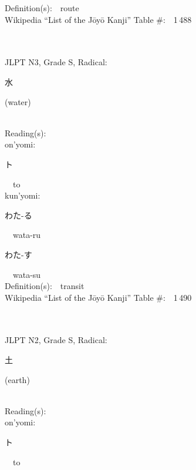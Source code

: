 \begin{multicols}{2}
Definition(s):\ \ route \\
Wikipedia ``List of the J\=oy\=o Kanji'' Table \#:\ \ 1\,488 \\
\ \ \\
{\fontsize{34pt}{40pt}  }\ \ \\  %
{JLPT N3, Grade S, Radical:\ \ {\begin{CJK}{UTF8}{min} 水 \end{CJK}} (water) } \\
Reading(s):\ \ \\
{\hspace*{1em}}on'yomi:\ \ \\
{\hspace*{2em}}{\begin{CJK}{UTF8}{min} ト \end{CJK}}\ \ to\ \ \\
{\hspace*{1em}}kun'yomi:\ \ \\
{\hspace*{2em}}{\begin{CJK}{UTF8}{min} わた-る \end{CJK}}\ \ wata-ru\ \ \\
{\hspace*{2em}}{\begin{CJK}{UTF8}{min} わた-す \end{CJK}}\ \ wata-su\ \ \\
Definition(s):\ \ transit \\
Wikipedia ``List of the J\=oy\=o Kanji'' Table \#:\ \ 1\,490 \\
\ \ \\
{\fontsize{34pt}{40pt}  }\ \ \\  %
{JLPT N2, Grade S, Radical:\ \ {\begin{CJK}{UTF8}{min} 土 \end{CJK}} (earth) } \\
Reading(s):\ \ \\
{\hspace*{1em}}on'yomi:\ \ \\
{\hspace*{2em}}{\begin{CJK}{UTF8}{min} ト \end{CJK}}\ \ to\ \ \\

\end{multicols}
